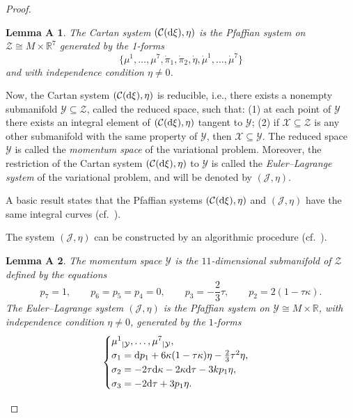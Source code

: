 \documentclass[pdftex]{sigma}
\numberwithin{equation}{section}
\newtheorem{lemmaA}{Lemma A\ignorespaces}
\begin{document}
\begin{proof}
\begin{lemmaA}%
The Cartan system $(\mathcal{C}({\rm d}\xi), \eta)$
is the Pfaffian system on $\mathcal{Z} \cong M\times \mathbb{R}^7$ generated by
the 1-forms
\[
\big\{\mu^1,\dots,\mu^7,\dot\pi_1,\dot\pi_2,\dot\eta,\dot\mu^1,\dots,\dot\mu^7\big\}
\]
and with independence condition $\eta\neq 0$.
\end{lemmaA}

Now, the Cartan system $(\mathcal{C}({\rm d}\xi), \eta)$ is reducible, i.e., there exists a nonempty submanifold
$\mathcal{Y} \subseteq \mathcal{Z}$, called the reduced space, such that: (1) at each point of $\mathcal{Y}$
there exists an integral element
of $(\mathcal{C}({\rm d}\xi), \eta)$ tangent to $\mathcal{Y}$; (2) if $\mathcal{X} \subseteq \mathcal{Z}$ is any other
submanifold with the same property of $\mathcal{Y}$, then $\mathcal{X} \subseteq\mathcal{Y}$.
The reduced space $\mathcal{Y}$ is called the \textit{momentum space} of
the variational problem. Moreover, the restriction of the Cartan system $(\mathcal{C}({\rm d}\xi), \eta)$ to $\mathcal{Y}$
is called the \textit{Euler--Lagrange system}
of the variational problem, and will be denoted by $(\mathcal{J}, \eta)$.

A basic result states that the Pfaffian systems $(\mathcal{C}({\rm d}\xi), \eta)$ and $(\mathcal{J}, \eta)$ have
the same integral curves (cf.~\cite{Gr, GM}).

The system $(\mathcal{J}, \eta)$ can be constructed by an algorithmic procedure (cf.~\cite{Gr}).

\begin{lemmaA}\label{l:EL-system}
The momentum space $\mathcal{Y}$ is the $11$-dimensional submanifold of $\mathcal{Z}$ defined by the
equations
\[
p_7 =1, \qquad p_6= p_5 = p_4=0 , \qquad p_3 = -\frac23\tau, \qquad p_2=2(1-\tau\kappa) .
\]
The Euler--Lagrange system $(\mathcal{J}, \eta)$ is the Pfaffian system
on $\mathcal{Y}\cong M\times \mathbb R$, with independence
condition $\eta\neq 0$, generated by the $1$-forms
\begin{equation}\label{generators-EL-syst}
\begin{cases}
{\mu^1}_{|\mathcal{Y}}, \dots, {\mu^7}_{|\mathcal{Y}}, \\
\sigma_1 = {\rm d}p_1 + 6 \kappa (1-\tau\kappa)\eta -\frac23 \tau^2\eta  ,\\
\sigma_2 = -2\tau {\rm d}\kappa -2\kappa {\rm d}\tau -3kp_1 \eta ,\\
\sigma_3 = - 2{\rm d}\tau + 3 p_1 \eta .\end{cases}
\end{equation}
\end{lemmaA}


\end{proof}
\end{document}
